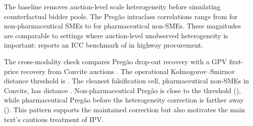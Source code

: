 \documentclass[12pt]{article}
\begin{document}
The baseline removes auction-level scale heterogeneity before simulating
counterfactual bidder pools. The Preg\~ao intraclass correlations range from
\iccNpSme{} for non-pharmaceutical SMEs to \iccPharmaNonSme{} for
pharmaceutical non-SMEs. These magnitudes are comparable to settings where
auction-level unobserved heterogeneity is important: \citet{krasnokutskaya2011}
reports an ICC benchmark of \krasICC{} in highway procurement.

The cross-modality check compares Preg\~ao drop-out recovery with a GPV
first-price recovery from Convite auctions \citep{gpv2000}. The operational
Kolmogorov--Smirnov distance threshold is \ksDistThresh. The cleanest
falsification cell, pharmaceutical non-SMEs in Convite, has distance
\ksConvitePharmaNS. Non-pharmaceutical Preg\~ao is close to the threshold
(\ksNpPregao), while pharmaceutical Preg\~ao before the heterogeneity correction
is farther away (\ksPharmaPregao). This pattern supports the maintained
correction but also motivates the main text's cautious treatment of IPV.
\end{document}
